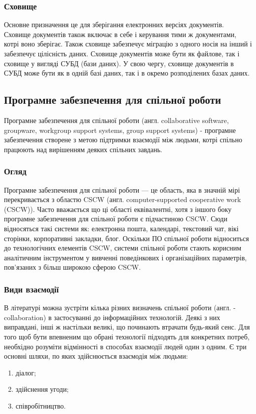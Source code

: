 \subsubsection{Сховище}
Основне призначення це для зберігання електронних версіях документів. 
Сховище документів також включає в себе і керування тими ж документами, котрі воно зберігає.
Також сховище забезпечує міграцію з одного носія на інший і забезпечує цілісність даних.
Сховище документів може бути як файлове, так і сховище у вигляді СУБД (бази даних). 
У свою чергу, сховище документів в СУБД може бути як в одній базі даних, так і в окремо розподілених базах даних.
        

\subsection{Програмне забезпечення для спільної роботи}
Програмне забезпечення для спільної роботи (англ. collaborative software, groupware, workgroup support systems, group support systems) - програмне забезпечення створене з метою підтримки взаємодії між людьми, котрі спільно працюють над вирішенням деяких спільних завдань. 

\subsubsection{Огляд}
Програмне забезпечення для спільної роботи --- це область, яка в значній мірі перекривається з областю CSCW (англ. computer-supported cooperative work (CSCW)).
Часто вважається що ці області еквівалентні, хотя з іншого боку програмне забезпечення для спільної роботи є підчастиною CSCW.
Сюди відносяться такі системи як: електронна пошта, календарі, текстовий чат, вікі сторінки, корпоративні закладки, блог.
Оскільки ПО спільної роботи відноситься до технологічних елементів CSCW, системи спільної роботи стають корисним аналітичним інструментом у вивченні поведінкових і організаційних параметрів, пов'язаних з більш широкою сферою CSCW.

\subsubsection{Види взаємодії}
В літературі можна зустріти кілька різних визначень спільної роботи (англ. - collaboration) в застосуванні до інформаційних технологій. Деякі з них виправдані, інші ж настільки великі, що починають втрачати будь-який сенс.
Для того щоб бути впевненим що обрані технології підходять для конкретних потреб, необхідно розуміти відмінності в способах взаємодії людей один з одним.
Є три основні шляхи, по яких здійснюється взаємодія між людьми: 
\begin{enumerate}
\item діалог;
\item здійснення угоди;
\item співробітництво.
\end{enumerate}


